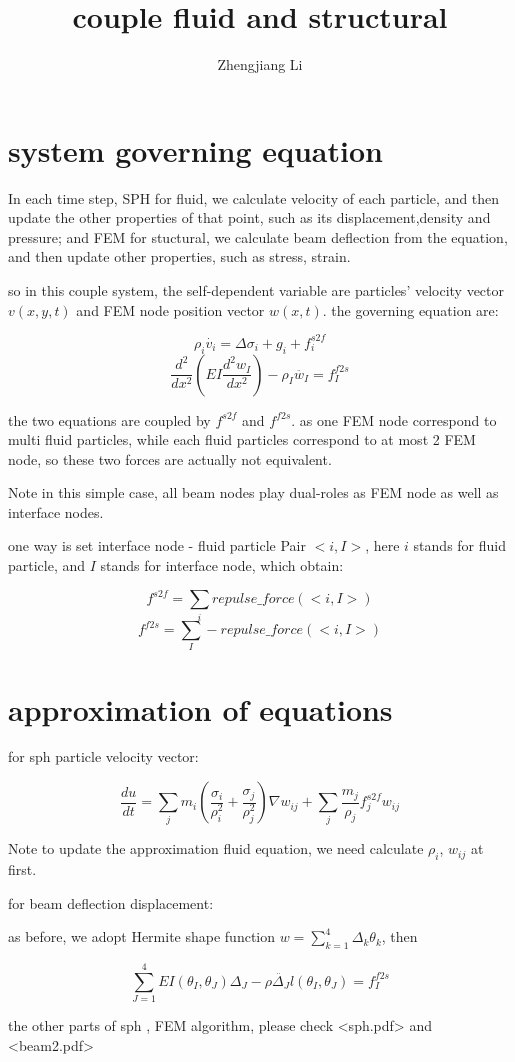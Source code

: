 \documentclass[11pt]{article}
\begin{document}
\title{couple fluid and structural}

\author{Zhengjiang Li}

\date{}

\maketitle



\section {system governing equation}

In each time step, SPH for fluid, we calculate velocity of each particle, and then update the other properties of that point, such as its displacement,density and  pressure; and FEM for stuctural, we calculate beam deflection from the equation, and then update other properties, such as stress, strain.

so in this couple system, the self-dependent variable are particles' velocity vector $v(x,y,t)$ and FEM node position vector $w(x,t)$. the governing equation are:

   $$	\rho _i \dot{v_i} = \Delta \sigma _i + g_i + f_i^{s2f} $$ 
   $$	\frac{d^2}{dx^2}(EI \frac{d^2w_I}{dx^2} )- \rho_I \ddot{w_I} = f_I^{f2s} $$

the two equations are coupled by $f^{s2f}$ and $f^{f2s}$. as one FEM node correspond to multi fluid particles, while each fluid particles correspond to at most 2 FEM node, so these two forces are actually not equivalent.


Note in this simple case, all beam nodes play dual-roles as FEM node as well as interface nodes. 

one way is set interface node - fluid particle Pair $<i, I>$, here $i$ stands for fluid particle, and $I$ stands for interface node, which obtain:

$$ f^{s2f} = \sum_i repulse\_force(<i,I>) $$
$$ f^{f2s} = \sum_I -repulse\_force(<i,I>) $$

\section{approximation of equations}

for sph particle velocity vector:

$$ \frac{du}{dt} = \sum_j m_i( \frac{\sigma_i}{\rho ^2 _i } + \frac{\sigma_j}{\rho^2 _j} )\nabla w_{ij} + \sum_j \frac{m_j}{\rho _j} f^{s2f}_j w_{ij} $$

Note to update the approximation fluid equation, we need calculate $\rho_i$, $w_{ij}$ at first.


for beam deflection displacement:

as before, we adopt Hermite shape function $ w = \sum_{k=1}^4 \Delta_k \theta_k $, then

$$ \sum_{J=1}^4 EI(\theta_I, \theta_J) \Delta_J - \rho \ddot{\Delta_J} l(\theta_I, \theta_J) = f_I^{f2s} $$

the other parts of sph , FEM algorithm, please check <sph.pdf> and <beam2.pdf>
\end{document}
